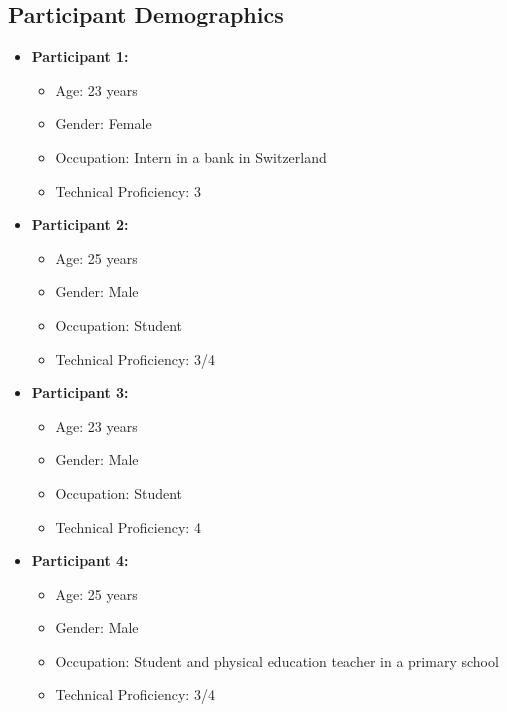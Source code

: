 \documentclass{article}
\begin{document}
\subsection{Participant Demographics}
\begin{itemize}
    \item \textbf{Participant 1:}
    \begin{itemize}
        \item Age: 23 years
        \item Gender: Female
        \item Occupation: Intern in a bank in Switzerland
        \item Technical Proficiency: 3
    \end{itemize}
    \item \textbf{Participant 2:}
    \begin{itemize}
        \item Age: 25 years
        \item Gender: Male
        \item Occupation: Student
        \item Technical Proficiency: 3/4
    \end{itemize}
    \item \textbf{Participant 3:}
    \begin{itemize}
        \item Age: 23 years
        \item Gender: Male
        \item Occupation: Student
        \item Technical Proficiency: 4
    \end{itemize}
    \item \textbf{Participant 4:}
    \begin{itemize}
        \item Age: 25 years
        \item Gender: Male
        \item Occupation: Student and physical education teacher in a primary school
        \item Technical Proficiency: 3/4
    \end{itemize}
\end{itemize}
\end{document}
